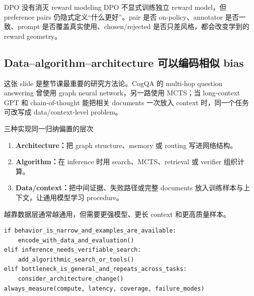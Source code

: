 
\begin{warningbox}{DPO 没有消灭 reward modeling}
DPO 不显式训练独立 reward model，但 preference pairs 仍隐式定义“什么更好”。pair 是否 on-policy、annotator 是否一致、prompt 是否覆盖真实使用、chosen/rejected 是否只差风格，都会改变学到的 reward geometry。
\end{warningbox}


\subsection{Data--algorithm--architecture 可以编码相似 bias}

这张 slide 是整节课最重要的研究方法论。CogQA 的 multi-hop question answering 曾使用 graph neural network，另一路使用 MCTS；当 long-context GPT 和 chain-of-thought 能把相关 documents 一次放入 context 时，同一个任务可改写成 data/context-level problem。


\begin{importantbox}{三种实现同一归纳偏置的层次}
\begin{enumerate}
  \item \textbf{Architecture：}把 graph structure、memory 或 routing 写进网络结构。
  \item \textbf{Algorithm：}在 inference 时用 search、MCTS、retrieval 或 verifier 组织计算。
  \item \textbf{Data/context：}把中间证据、失败路径或完整 documents 放入训练样本与上下文，让通用模型学习 procedure。
\end{enumerate}
越靠数据层通常越通用，但需要更强模型、更长 context 和更高质量样本。
\end{importantbox}

\begin{lstlisting}[caption={选择 data、algorithm 或 architecture 的决策框架}]
if behavior_is_narrow_and_examples_are_available:
    encode_with_data_and_evaluation()
elif inference_needs_verifiable_search:
    add_algorithmic_search_or_tools()
elif bottleneck_is_general_and_repeats_across_tasks:
    consider_architecture_change()
always_measure(compute, latency, coverage, failure_modes)
\end{lstlisting}


